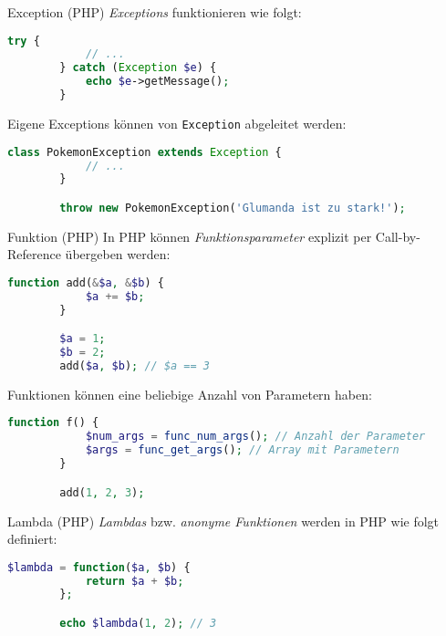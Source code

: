 \begin{defi}{Exception (PHP)}
    \emph{Exceptions} funktionieren wie folgt:

    \begin{lstlisting}[language=php]
        try {
            // ...
        } catch (Exception $e) {
            echo $e->getMessage();
        }
    \end{lstlisting}

    Eigene Exceptions können von \texttt{Exception} abgeleitet werden:

    \begin{lstlisting}[language=php]
        class PokemonException extends Exception {
            // ...
        }

        throw new PokemonException('Glumanda ist zu stark!');
    \end{lstlisting}
\end{defi}

\begin{defi}{Funktion (PHP)}
    In PHP können \emph{Funktionsparameter} explizit per Call-by-Reference übergeben werden:

    \begin{lstlisting}[language=php]
        function add(&$a, &$b) {
            $a += $b;
        }

        $a = 1;
        $b = 2;
        add($a, $b); // $a == 3
    \end{lstlisting}

    Funktionen können eine beliebige Anzahl von Parametern haben:


    \begin{lstlisting}[language=php]
        function f() {
            $num_args = func_num_args(); // Anzahl der Parameter
            $args = func_get_args(); // Array mit Parametern
        }

        add(1, 2, 3);
    \end{lstlisting}
\end{defi}

\begin{defi}{Lambda (PHP)}
    \emph{Lambdas} bzw. \emph{anonyme Funktionen} werden in PHP wie folgt definiert:

    \begin{lstlisting}[language=php]
        $lambda = function($a, $b) {
            return $a + $b;
        };

        echo $lambda(1, 2); // 3
    \end{lstlisting}
\end{defi}

